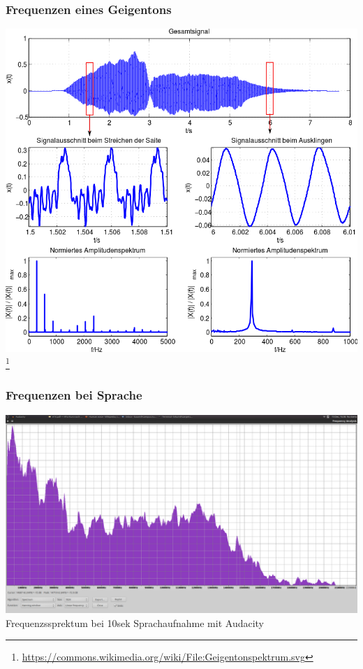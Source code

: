 \begin{frame}
\frametitle{Frequenzen eines Geigentons}
\begin{center}
\includegraphics[height=0.8\textheight]{e14/geigenton.png}\\
	\footnote{\url{https://commons.wikimedia.org/wiki/File:Geigentonspektrum.svg}}\\
\end{center}
\end{frame}

\begin{frame}
\frametitle{Frequenzen bei Sprache}
\begin{center}
\includegraphics[height=0.8\textheight]{e14/spracheFrequenzen.png}\\
	Frequenzssprektum bei 10sek Sprachaufnahme mit Audacity
\end{center}
\end{frame}

